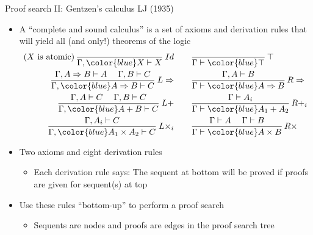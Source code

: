 \documentclass[english]{beamer}
\begin{document}
\begin{frame}{Proof search II: Gentzen's calculus LJ (1935)}

\begin{itemize}
\item A ``complete and sound calculus'' is a set of axioms and derivation
rules that will yield all (and only!) theorems of the logic
\begin{align*}
\text{(}X\text{ is atomic)\,}\frac{}{\Gamma,{\color{blue}X}\vdash X}\:Id & \qquad\frac{}{\Gamma\vdash{\color{blue}\top}}\,\top\\
\frac{\Gamma,A\Rightarrow B\vdash A\quad\;\Gamma,B\vdash C}{\Gamma,{\color{blue}A\Rightarrow B}\vdash C}\:L\Rightarrow & \qquad\frac{\Gamma,A\vdash B}{\Gamma\vdash{\color{blue}A\Rightarrow B}}\,R\Rightarrow\\
\frac{\Gamma,A\vdash C\quad\;\Gamma,B\vdash C}{\Gamma,{\color{blue}A+B}\vdash C}\:L+ & \qquad\frac{\Gamma\vdash A_{i}}{\Gamma\vdash{\color{blue}A_{1}+A_{2}}}\,R+_{i}\\
\frac{\Gamma,A_{i}\vdash C}{\Gamma,{\color{blue}A_{1}\times A_{2}}\vdash C}\:L\times_{i} & \qquad\frac{\Gamma\vdash A\quad\;\Gamma\vdash B}{\Gamma\vdash{\color{blue}A\times B}}\,R\times
\end{align*}
\item Two axioms and eight derivation rules
\begin{itemize}
\item Each derivation rule says: The sequent at bottom will be proved if
proofs are given for sequent(s) at top
\end{itemize}
\item Use these rules ``bottom-up'' to perform a proof search
\begin{itemize}
\item Sequents are nodes and proofs are edges in the proof search tree
\end{itemize}
\end{itemize}
\end{frame}
\end{document}
